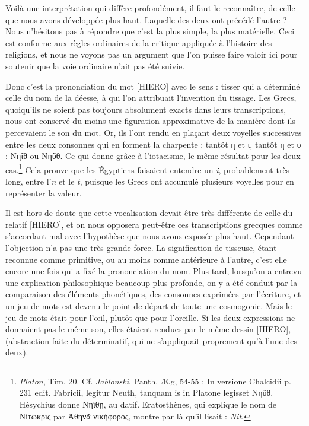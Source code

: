 \documentclass[a4paper, 11pt, oneside]{article}
\begin{document}
Voilà une interprétation qui diffère profondément, il faut le reconnaître, de celle que nous avons développée plus haut. Laquelle des deux ont précédé l'autre ? Nous n'hésitons pas à répondre que c'est la plus simple, la plus matérielle. Ceci est conforme aux règles ordinaires de la critique appliquée à l'histoire des religions, et nous ne voyons pas un argument que l'on puisse faire valoir ici pour soutenir que la voie ordinaire n'ait pas été suivie.

Donc c'est la prononciation du mot [HIERO] avec le sens : tisser qui a déterminé celle du nom de la déesse, à qui l'on attribuait l'invention du tissage. Les Grecs, quoiqu'ils ne soient pas toujours absolument exacts dans leurs transcriptions, nous ont conservé du moins une figuration approximative de la manière dont ils percevaient le son du mot. Or, ils l'ont rendu en plaçant deux voyelles successives entre les deux consonnes qui en forment la charpente : tantôt η et ι, tantôt η et υ : Νηΐθ ou Νηῦθ. Ce qui donne grâce à l'iotacisme, le même résultat pour les deux cas.\footnote{\emph{Platon}, Tim. 20. Cf. \emph{Jablonski}, Panth. Æ.g, 54-55 : In versione Chalcidii p. 231 edit. Fabricii, legitur Neuth, tanquam is in Platone legisset Νηῦθ. Hésychius donne Νηΐθῃ, au datif. Eratosthènes, qui explique le nom de Νίτωκρις par Ἀθηνᾶ νικήφορος, montre par là qu'il lisait : \emph{Nit}.} Cela prouve que les Égyptiens faisaient entendre un \emph{i}, probablement très-long, entre l'\emph{n} et le \emph{t}, puisque les Grecs ont accumulé plusieurs voyelles pour en représenter la valeur.

Il est hors de doute que cette vocalisation devait être très-différente de celle du relatif [HIERO], et on nous opposera peut-être ces transcriptions grecques comme s'accordant mal avec l'hypothèse que nous avons exposée plus haut. Cependant l'objection n'a pas une très grande force. La signification de tisseuse, étant reconnue comme primitive, ou au moins comme antérieure à l'autre, c'est elle encore une fois qui a fixé la prononciation du nom. Plus tard, lorsqu’on a entrevu une explication philosophique beaucoup plus profonde, on y a été conduit par la comparaison des éléments phonétiques, des consonnes exprimées par l'écriture, et un jeu de mots est devenu le point de départ de toute une cosmogonie. Mais le jeu de mots était pour l'œil, plutôt que pour l'oreille. Si les deux expressions ne donnaient pas le même son, elles étaient rendues par le même dessin [HIERO], (abstraction faite du déterminatif, qui ne s'appliquait proprement qu'à l'une des deux).
\end{document}
